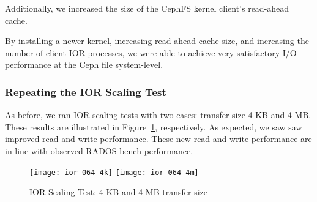 


Additionally, we increased the size of the CephFS kernel client's read-ahead
cache.  

\begin{comment}
\begin{figure}[htb]
\centering
\texttt{[image: ior\_kernel\_change]}
\caption{CephFS performance with kernel changes to 3.9, IOR with 4 MB transfer
size}
\label{fig:ior-kernel-39}
\end{figure}
\end{comment}

By installing a newer kernel, increasing read-ahead cache size, and increasing
the number of client IOR processes, we were able to achieve very satisfactory
I/O performance at the Ceph file system-level.


\subsubsection{Repeating the IOR Scaling Test}

As before, we ran IOR scaling tests with two cases: transfer size 4 KB and 4
MB.  These results are illustrated in Figure~\ref{fig:ior-064}, respectively.
As expected, we saw saw  improved read and write performance. These new read
and write performance are in line with observed RADOS bench performance.


\begin{figure}[htb]
\centering
\texttt{[image: ior-064-4k]}
\texttt{[image: ior-064-4m]}
\caption{IOR Scaling Test: 4 KB and 4 MB transfer size}
\label{fig:ior-064}
\end{figure}

